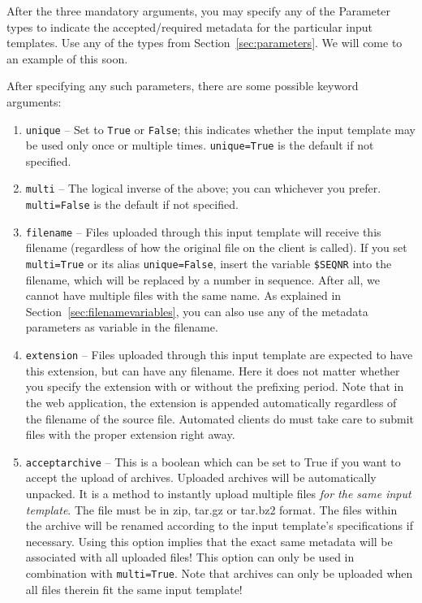 \documentclass[a4paper,12pt,twoside,openright]{report}
\begin{document}
After the three mandatory arguments, you may specify any of the Parameter types
to indicate the accepted/required metadata for the particular input templates.
Use any of the types from Section~\ref{sec:parameters}. We will come to an
example of this soon. 

After specifying any such parameters, there are some possible keyword arguments:

\begin{enumerate}[leftmargin=5mm]
\item \texttt{unique} -- Set to \texttt{True} or \texttt{False}; this indicates whether the input template may be used only once or multiple times. \texttt{unique=True} is the default if not specified.
\item \texttt{multi} -- The logical inverse of the above; you can whichever you prefer. \texttt{multi=False} is the default if not specified.
\item \texttt{filename} -- Files uploaded through this input template will
  receive this filename (regardless of how the original file on the client is
  called). If you set \texttt{multi=True} or its alias \texttt{unique=False},
  insert the variable \texttt{\$SEQNR} into the filename, which will be
  replaced by a number in sequence. After all, we cannot have multiple files
  with the same name. As explained in Section~\ref{sec:filenamevariables}, you
  can also use any of the metadata parameters as variable in the filename.
\item \texttt{extension} -- Files uploaded through this input template are
  expected to have this extension, but can have any filename. Here it
  does not matter whether you specify the extension with or without the
  prefixing period. Note that in the web application, the extension is appended
  automatically regardless of the filename of the source file. Automated
  clients do must take care to submit files with the proper extension right away. 
\item \texttt{acceptarchive} -- This is a boolean which can be set to True if
  you want to accept the upload of archives. Uploaded archives will be
  automatically unpacked. It is a method to instantly upload multiple files
  \emph{for the same input template}. The file must be in zip, tar.gz or
  tar.bz2 format. The files within the archive will be
  renamed according to the input template's specifications if necessary. Using
  this option implies that the exact same metadata will be associated with all
  uploaded files! This option can only be used in combination with
  \texttt{multi=True}. Note that archives can only be uploaded when all files
  therein fit the same input template!
\end{enumerate}
\end{document}

